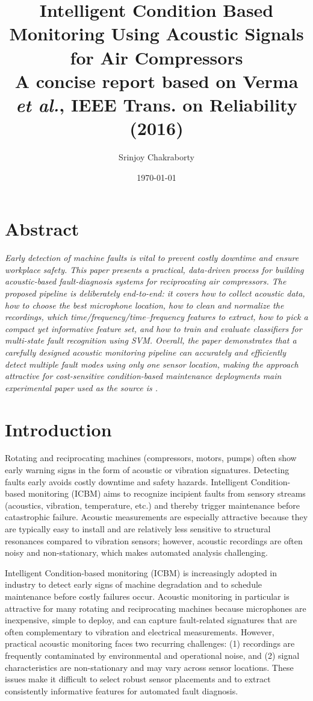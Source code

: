 \documentclass[12pt,a4paper]{article}
\title{Intelligent Condition Based Monitoring Using
Acoustic Signals for Air Compressors\\
\vspace{6pt}
\large A concise report based on Verma \textit{et al.}, IEEE Trans. on Reliability (2016)}
\author{Srinjoy Chakraborty}
\date{\today}
\begin{document}
\newpage
\tableofcontents
\listoffigures
\newpage
\begin{multicols}{2}
\section{Abstract}
\textit{Early detection of machine faults is vital to prevent costly downtime and ensure workplace safety. This paper presents a practical, data-driven process for building acoustic-based fault-diagnosis systems for reciprocating air compressors. The proposed pipeline is deliberately end-to-end: it covers how to collect acoustic data, how to choose the best microphone location, how to clean and normalize the recordings, which time/frequency/time–frequency features to extract, how to pick a compact yet informative feature set, and how to train and evaluate classifiers for multi-state fault recognition using SVM.
Overall, the paper demonstrates that a carefully designed acoustic monitoring pipeline can accurately and efficiently detect multiple fault modes using only one sensor location, making the approach attractive for cost-sensitive condition-based maintenance deployments main experimental paper used as the source is \cite{Verma2016}.}


\section{Introduction}
Rotating and reciprocating machines (compressors, motors, pumps) often show early warning signs in the form of acoustic or vibration signatures. Detecting faults early avoids costly downtime and safety hazards. Intelligent Condition-based monitoring (ICBM) aims to recognize incipient faults from sensory streams (acoustics, vibration, temperature, etc.) and thereby trigger maintenance before catastrophic failure. Acoustic measurements are especially attractive because they are typically easy to install and are relatively less sensitive to structural resonances compared to vibration sensors; however, acoustic recordings are often noisy and non-stationary, which makes automated analysis challenging.

Intelligent Condition-based monitoring (ICBM) is increasingly adopted in industry to detect early signs of machine degradation and to schedule maintenance before costly failures occur. Acoustic monitoring in particular is attractive for many rotating and reciprocating machines because microphones are inexpensive, simple to deploy, and can capture fault-related signatures that are often complementary to vibration and electrical measurements. However, practical acoustic monitoring faces two recurring challenges: (1) recordings are frequently contaminated by environmental and operational noise, and (2) signal characteristics are non-stationary and may vary across sensor locations. These issues make it difficult to select robust sensor placements and to extract consistently informative features for automated fault diagnosis.


\end{multicols}
\end{document}

